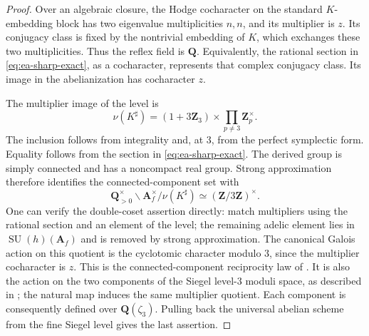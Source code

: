 \documentclass[11pt]{article}
\theoremstyle{definition}
\theoremstyle{remark}
\begin{document}
\begin{proof}
Over an algebraic closure, the Hodge cocharacter on the standard
$K$-embedding block has two eigenvalue multiplicities $n,n$, and its
multiplier is $z$.  Its conjugacy class is fixed by the nontrivial
embedding of $K$, which exchanges these two multiplicities.  Thus the
reflex field is $\mathbf Q$.  Equivalently, the rational section in
\eqref{eq:ea-sharp-exact}, as a cocharacter, represents that complex
conjugacy class.  Its image in the abelianization has cocharacter $z$.

The multiplier image of the level is
\[
 \nu(K^\sharp)=
 (1+3\mathbf Z_3)\times\prod_{p\ne3}\mathbf Z_p^\times.
\]
The inclusion follows from integrality and, at $3$, from the perfect
symplectic form.  Equality follows from the section in
\eqref{eq:ea-sharp-exact}.  The derived group is simply connected and
has a noncompact real group.  Strong approximation therefore identifies
the connected-component set with
\[
 \mathbf Q_{>0}^{\times}\backslash\mathbf A_f^\times/
                    \nu(K^\sharp)\simeq(\mathbf Z/3\mathbf Z)^\times.
\]
One can verify the double-coset assertion directly: match multipliers
using the rational section and an element of the level; the remaining
adelic element lies in $\operatorname{SU}(h)(\mathbf A_f)$ and is
removed by strong approximation.  The canonical Galois action on this
quotient is the cyclotomic character modulo $3$, since the multiplier
cocharacter is $z$.  This is the connected-component reciprocity law
of \cite[Theorem~5.17 and \S13, formula~(64), pp.~59 and~119]{MilneShimura}.
It is also the action on the two components of the Siegel level-$3$
moduli space, as described in \cite[p.~125]{MilneShimura}; the natural
map induces the same multiplier quotient.  Each component is consequently
defined over $\mathbf Q(\zeta_3)$.  Pulling back the universal abelian
scheme from the fine Siegel level gives the last assertion.


\end{proof}
\end{document}
